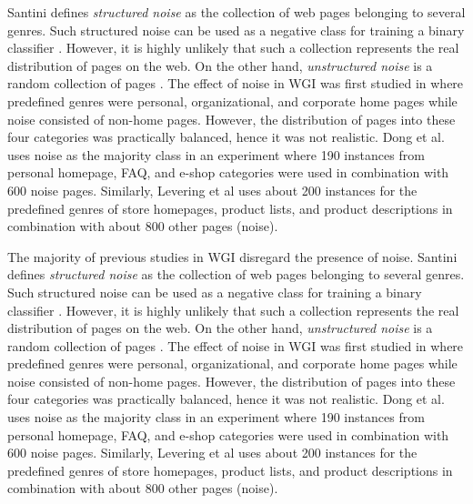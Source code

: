 Santini \parencite{santini2011cross} defines \textit{structured noise} as the collection of web pages belonging to  several genres. Such structured noise can be used as a negative class for training a binary classifier \parencite{Vidulin2007}. However, it is highly unlikely that such a collection  represents the real distribution of pages on the web. On the other hand, \textit{unstructured noise} is a random collection of pages \parencite{santini2011cross}. The effect of noise in WGI  was first studied in \parencite{shepherd2004cybergenre,kennedy2005automatic} where predefined genres were personal, organizational, and corporate home pages while noise consisted of non-home  pages. However, the distribution of pages into these four categories was practically balanced, hence it was not realistic. Dong et al.\parencite{dong2006binary} uses noise as the majority  class in an experiment where 190 instances from personal homepage, FAQ, and e-shop categories were used in combination with 600 noise pages. Similarly, Levering et al \parencite{levering2008using} uses about 200 instances for the predefined genres of store homepages, product lists, and product descriptions in combination with about 800 other pages (noise).

The majority of previous studies in WGI disregard the presence of noise. Santini \parencite{santini2011cross} defines \textit{structured noise} as the collection of web pages belonging to several genres. Such structured noise can be used as a negative class for training a binary classifier \parencite{Vidulin2007}. However, it is highly unlikely that such a collection represents the real distribution of pages on the web. On the other hand, \textit{unstructured noise} is a random collection of pages \parencite{santini2011cross}. The effect of noise in WGI was first studied in \parencite{shepherd2004cybergenre,kennedy2005automatic} where predefined genres were personal, organizational, and corporate home pages while noise consisted of non-home pages. However, the distribution of pages into these four categories was practically balanced, hence it was not realistic. Dong et al.\parencite{dong2006binary} uses noise as the majority class in an experiment where 190 instances from personal homepage, FAQ, and e-shop categories were used in combination with 600 noise pages. Similarly, Levering et al \parencite{levering2008using} uses about 200 instances for the predefined genres of store homepages, product lists, and product descriptions in combination with about 800 other pages (noise).

